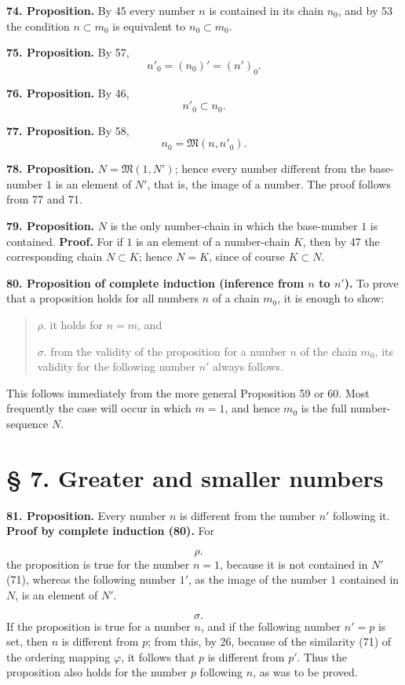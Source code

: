 \documentclass[11pt]{article}
\newcommand{\Mf}{\mathfrak{M}}
\newcommand{\partof}{\mathrel{\subset}}
\begin{document}
\noindent\textbf{74. Proposition.} By 45 every number $n$ is contained in its chain $n_0$, and by 53 the condition $n\partof m_0$ is equivalent to $n_0\partof m_0$.

\noindent\textbf{75. Proposition.} By 57,
\[
n'_0=(n_0)'=(n')_0.
\]

\noindent\textbf{76. Proposition.} By 46,
\[
n'_0\partof n_0.
\]

\noindent\textbf{77. Proposition.} By 58,
\[
n_0=\Mf(n,n'_0).
\]

\noindent\textbf{78. Proposition.} $N=\Mf(1,N')$; hence every number different from the base-number $1$ is an element of $N'$, that is, the image of a number. The proof follows from 77 and 71.

\noindent\textbf{79. Proposition.} $N$ is the only number-chain in which the base-number $1$ is contained. \textbf{Proof.} For if $1$ is an element of a number-chain $K$, then by 47 the corresponding chain $N\partof K$; hence $N=K$, since of course $K\partof N$.

\noindent\textbf{80. Proposition of complete induction (inference from $n$ to $n'$).} To prove that a proposition holds for all numbers $n$ of a chain $m_0$, it is enough to show:
\begin{quote}
\(\rho.\) it holds for \(n=m\), and

\(\sigma.\) from the validity of the proposition for a number \(n\) of the chain \(m_0\), its validity for the following number \(n'\) always follows.
\end{quote}
This follows immediately from the more general Proposition 59 or 60. Most frequently the case will occur in which $m=1$, and hence $m_0$ is the full number-sequence $N$.

\section*{§ 7. Greater and smaller numbers}

\noindent\textbf{81. Proposition.} Every number $n$ is different from the number $n'$ following it. \textbf{Proof by complete induction (80).} For

\[
\rho.\quad
\]
the proposition is true for the number $n=1$, because it is not contained in $N'$ (71), whereas the following number $1'$, as the image of the number $1$ contained in $N$, is an element of $N'$.

\[
\sigma.\quad
\]
If the proposition is true for a number $n$, and if the following number $n'=p$ is set, then $n$ is different from $p$; from this, by 26, because of the similarity (71) of the ordering mapping $\varphi$, it follows that $p$ is different from $p'$. Thus the proposition also holds for the number $p$ following $n$, as was to be proved.
\end{document}
